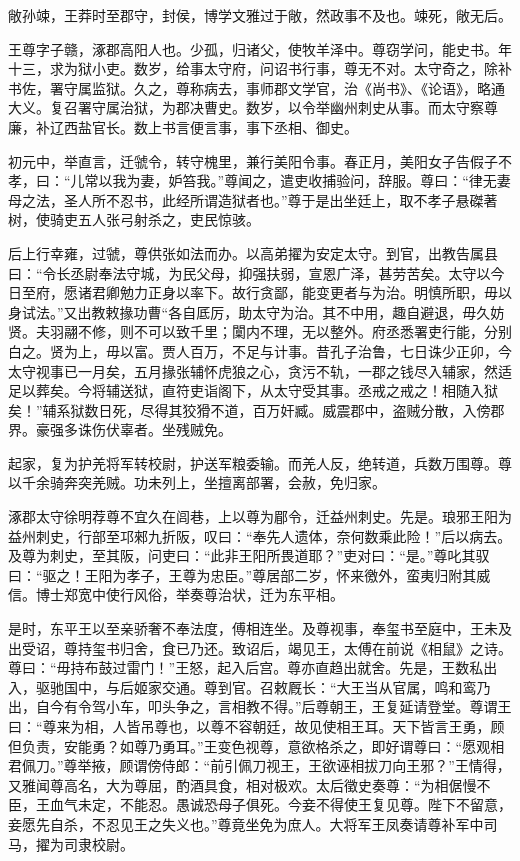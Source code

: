 \documentclass[]{article}
\begin{document}
敞孙竦，王莽时至郡守，封侯，博学文雅过于敞，然政事不及也。竦死，敞无后。

王尊字子赣，涿郡高阳人也。少孤，归诸父，使牧羊泽中。尊窃学问，能史书。年十三，求为狱小吏。数岁，给事太守府，问诏书行事，尊无不对。太守奇之，除补书佐，署守属监狱。久之，尊称病去，事师郡文学官，治《尚书》、《论语》，略通大义。复召署守属治狱，为郡决曹史。数岁，以令举幽州刺史从事。而太守察尊廉，补辽西盐官长。数上书言便言事，事下丞相、御史。

初元中，举直言，迁虢令，转守槐里，兼行美阳令事。春正月，美阳女子告假子不孝，曰：``儿常以我为妻，妒笞我。''尊闻之，遣吏收捕验问，辞服。尊曰：``律无妻母之法，圣人所不忍书，此经所谓造狱者也。''尊于是出坐廷上，取不孝子悬磔著树，使骑吏五人张弓射杀之，吏民惊骇。

后上行幸雍，过虢，尊供张如法而办。以高弟擢为安定太守。到官，出教告属县曰：``令长丞尉奉法守城，为民父母，抑强扶弱，宣恩广泽，甚劳苦矣。太守以今日至府，愿诸君卿勉力正身以率下。故行贪鄙，能变更者与为治。明慎所职，毋以身试法。''又出教敕掾功曹``各自厎厉，助太守为治。其不中用，趣自避退，毋久妨贤。夫羽翮不修，则不可以致千里；闑内不理，无以整外。府丞悉署吏行能，分别白之。贤为上，毋以富。贾人百万，不足与计事。昔孔子治鲁，七日诛少正卯，今太守视事已一月矣，五月掾张辅怀虎狼之心，贪污不轨，一郡之钱尽入辅家，然适足以葬矣。今将辅送狱，直符吏诣阁下，从太守受其事。丞戒之戒之！相随入狱矣！''辅系狱数日死，尽得其狡猾不道，百万奸臧。威震郡中，盗贼分散，入傍郡界。豪强多诛伤伏辜者。坐残贼免。

起家，复为护羌将军转校尉，护送军粮委输。而羌人反，绝转道，兵数万围尊。尊以千余骑奔突羌贼。功未列上，坐擅离部署，会赦，免归家。

涿郡太守徐明荐尊不宜久在闾巷，上以尊为郿令，迁益州刺史。先是。琅邪王阳为益州刺史，行部至邛郲九折阪，叹曰：``奉先人遗体，奈何数乘此险！''后以病去。及尊为刺史，至其阪，问吏曰：``此非王阳所畏道耶？''吏对曰：``是。''尊叱其驭曰：``驱之！王阳为孝子，王尊为忠臣。''尊居部二岁，怀来徼外，蛮夷归附其威信。博士郑宽中使行风俗，举奏尊治状，迁为东平相。

是时，东平王以至亲骄奢不奉法度，傅相连坐。及尊视事，奉玺书至庭中，王未及出受诏，尊持玺书归舍，食已乃还。致诏后，竭见王，太傅在前说《相鼠》之诗。尊曰：``毋持布鼓过雷门！''王怒，起入后宫。尊亦直趋出就舍。先是，王数私出入，驱驰国中，与后姬家交通。尊到官。召敕厩长：``大王当从官属，鸣和鸾乃出，自今有令驾小车，叩头争之，言相教不得。''后尊朝王，王复延请登堂。尊谓王曰：``尊来为相，人皆吊尊也，以尊不容朝廷，故见使相王耳。天下皆言王勇，顾但负责，安能勇？如尊乃勇耳。''王变色视尊，意欲格杀之，即好谓尊曰：``愿观相君佩刀。''尊举掖，顾谓傍侍郎：``前引佩刀视王，王欲诬相拔刀向王邪？''王情得，又雅闻尊高名，大为尊屈，酌酒具食，相对极欢。太后徵史奏尊：``为相倨慢不臣，王血气未定，不能忍。愚诚恐母子俱死。今妾不得使王复见尊。陛下不留意，妾愿先自杀，不忍见王之失义也。''尊竟坐免为庶人。大将军王凤奏请尊补军中司马，擢为司隶校尉。
\end{document}
